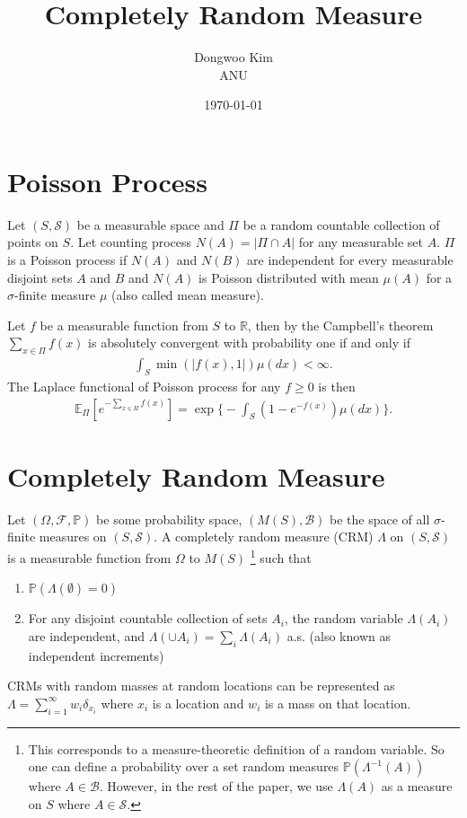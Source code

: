 \documentclass{article}
\title{Completely Random Measure}
\date{\today}
\author{Dongwoo Kim\\ANU}
\begin{document}
\maketitle

\section{Poisson Process}
\label{sec:pp}
Let $(S, \mathcal{S})$ be a measurable space and $\Pi$ be a random countable collection of points on $S$. Let  counting process $N(A) = |\Pi \cap A|$ for any measurable set $A$. $\Pi$ is a Poisson process if $N(A)$ and $N(B)$ are independent for every measurable disjoint sets $A$ and $B$ and $N(A)$ is Poisson distributed with mean $\mu(A)$ for a $\sigma$-finite measure $\mu$ (also called mean measure).

Let $f$ be a measurable function from $S$ to $\mathbb{R}$, then by the Campbell's theorem $\sum_{x\in \Pi} f(x)$ is absolutely convergent with probability one if and only if
\begin{align}
\int_{S} \min(|f(x), 1|)\mu(dx) < \infty.
\end{align}
The Laplace functional of Poisson process for any $f \ge 0$ is then
\begin{align}
\mathbb{E}_{\Pi}[e^{-\sum_{x \in \Pi}f(x)}] = \exp \Bigg\{ - \int_{S} (1-e^{-f(x)})\mu(dx) \Bigg\}.
\end{align}

\section{Completely Random Measure}
Let $(\Omega, \mathcal{F}, \mathbb{P})$ be some probability space, $(M(S), \mathcal{B})$ be the space of all $\sigma$-finite measures on $(S, \mathcal{S})$. A completely random measure (CRM) $\Lambda$ on $(S, \mathcal{S})$ is a measurable function from $\Omega$ to $M(S)$ \footnote{This corresponds to a measure-theoretic definition of a random variable. So one can define a probability over a set random measures $\mathbb{P}(\Lambda^{-1}(A))$ where $A \in \mathcal{B}$. However, in the rest of the paper, we use $\Lambda(A)$ as a measure on $S$ where $A \in \mathcal{S}$.} such that
\begin{enumerate}
\item $\mathbb{P}(\Lambda(\emptyset) = 0)$
\item For any disjoint countable collection of sets $A_i$, the random variable $\Lambda(A_i)$ are independent, and $\Lambda(\cup A_i) = \sum_i \Lambda(A_i)$ a.s. (also known as independent increments)
\end{enumerate}
CRMs with random masses at random locations can be represented as $\Lambda = \sum_{i=1}^{\infty} w_i \delta_{x_i}$ where $x_i$ is a location and $w_i$ is a mass on that location.
\end{document}
